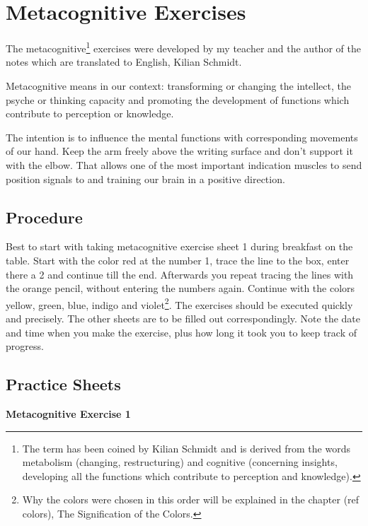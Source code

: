 \documentclass[../main.tex]{subfiles}
\begin{document}
  \chapter{Metacognitive Exercises}\label{metacognitive}
  The metacognitive\footnote{The term has been coined by Kilian Schmidt and is derived from the words metabolism (changing, restructuring) and cognitive (concerning insights, developing all the functions which contribute to perception and knowledge).} exercises were developed by my teacher and the author of the notes which are translated to English, Kilian Schmidt.


Metacognitive means in our context: {transforming} or changing the {intellect}, the
psyche or {thinking capacity}  and promoting the development of
functions which contribute to perception or knowledge.



The intention is to {influence the mental functions} with corresponding {movements of our hand}.
Keep the arm freely above the writing surface and don't support it with the elbow. {That allows one of the most important indication muscles to  send position signals to and training our brain in a positive direction.}

\section{Procedure}

Best to start with taking metacognitive exercise sheet 1 during breakfast on the table. Start with the color red at the number 1, trace the line to the box, enter there a 2 and continue till the end. Afterwards you repeat tracing the lines with the orange pencil, without entering the numbers again. Continue with the colors yellow, green, blue, indigo and violet\footnote{Why the colors were chosen in this order will be explained in the chapter (ref colors), The Signification of the Colors.}. The exercises should be executed quickly and precisely. The other sheets are to be filled out correspondingly. Note the date and time when you make the exercise, plus how long it took you to keep track of progress.


\newpage
\section{Practice Sheets}

\noindent \textbf{Metacognitive Exercise 1}
\end{document}
